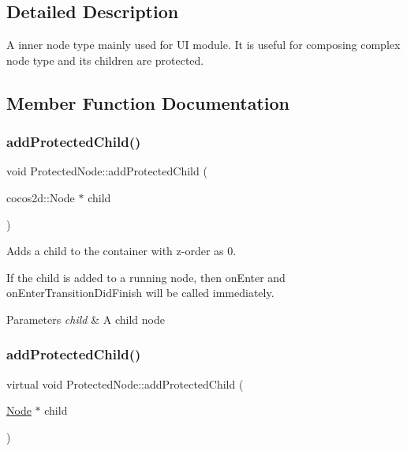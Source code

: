 \subsection{Detailed Description}
A inner node type mainly used for UI module. It is useful for composing complex node type and it\textquotesingle{}s children are protected. 

\subsection{Member Function Documentation}
\mbox{\label{classProtectedNode_ad36ce9f2e11226af49dec57aae1da4be}} 
\subsubsection{\texorpdfstring{add\+Protected\+Child()}{addProtectedChild()}\hspace{0.1cm}{\footnotesize\ttfamily [1/6]}}
{\footnotesize\ttfamily void Protected\+Node\+::add\+Protected\+Child (\begin{DoxyParamCaption}\item[{cocos2d\+::\+Node $\ast$}]{child }\end{DoxyParamCaption})\hspace{0.3cm}{\ttfamily [virtual]}}

Adds a child to the container with z-\/order as 0.

If the child is added to a \textquotesingle{}running\textquotesingle{} node, then \textquotesingle{}on\+Enter\textquotesingle{} and \textquotesingle{}on\+Enter\+Transition\+Did\+Finish\textquotesingle{} will be called immediately.


\begin{DoxyParams}{Parameters}
{\em child} & A child node \\
\hline
\end{DoxyParams}
\mbox{\label{classProtectedNode_a209c517b7a0b0f4dd1d0e0da97eff58d}} 
\subsubsection{\texorpdfstring{add\+Protected\+Child()}{addProtectedChild()}\hspace{0.1cm}{\footnotesize\ttfamily [2/6]}}
{\footnotesize\ttfamily virtual void Protected\+Node\+::add\+Protected\+Child (\begin{DoxyParamCaption}\item[{\hyperlink{classNode}{Node} $\ast$}]{child }\end{DoxyParamCaption})\hspace{0.3cm}{\ttfamily [virtual]}}

